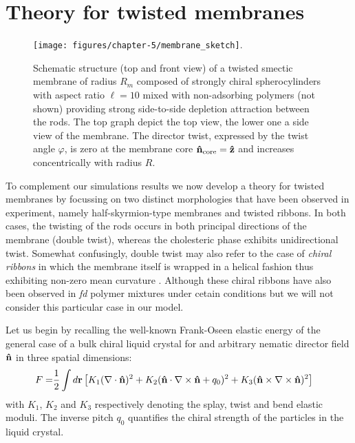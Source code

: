 \section{Theory for twisted membranes}




\begin{figure}
\texttt{[image: figures/chapter-5/membrane\_sketch]}.
\caption{ \label{memsnap} Schematic structure (top and front view) of a twisted smectic membrane of radius $R_{m}$ composed of strongly chiral spherocylinders with aspect ratio $\ell = 10$ mixed with non-adsorbing polymers (not shown) providing strong side-to-side depletion attraction between the rods.  The top graph depict the top view, the lower one a side view of the membrane. The director twist, expressed by the twist angle $\varphi$, is zero at  the membrane  core ${\bf \hat{n}} _{\rm core} = {\bf \hat{z}}$ and increases concentrically with radius $R$.}
\end{figure}




 To complement our simulations results we now develop a theory for twisted membranes by focussing on two distinct morphologies that have been observed in experiment, namely half-skyrmion-type membranes and twisted ribbons. In both cases, the twisting of the rods occurs in both principal directions of the membrane (double twist), whereas the cholesteric phase exhibits unidirectional twist. Somewhat confusingly, double twist may also refer to the case of {\em chiral ribbons} in which the membrane itself is wrapped 
in a helical fashion thus exhibiting non-zero mean curvature \cite{green1936equilibrium,chopin2016roadmap}. Although these chiral ribbons have also been observed in {\em fd} polymer mixtures under cetain conditions \cite{Gibaud2012} but we will not consider this particular case in our model.
 
 
 Let us begin by recalling the well-known Frank-Oseen elastic energy of the general case of a bulk chiral liquid crystal for and arbitrary nematic director field ${\bf \hat{n}}$ in three spatial dimensions:
\begin{align} 
F = & \frac{1}{2} \int d {\bf r} \left [ K_{1} (\nabla \cdot {\bf \hat{n}})^{2}  + K_{2} ({\bf \hat{n}} \cdot \nabla \times {\bf \hat{n}} + q_{0})^{2}  +   K_{3} ({\bf \hat{n}} \times \nabla \times {\bf \hat{n}})^{2} \right ]  
\end{align}
with $K_{1}$, $K_{2}$ and $K_{3}$ respectively denoting the splay, twist and bend elastic moduli.   The inverse  pitch  $q_{0}$ quantifies the chiral strength of the particles in the liquid crystal. 


